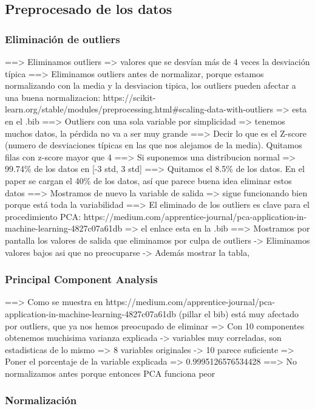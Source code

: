 \documentclass[11pt]{article}
\begin{document}
\subsection{Preprocesado de los datos}

\subsubsection{Eliminación de outliers}

==> Eliminamos outliers => valores que se desvían más de 4 veces la desviación típica
==> Eliminamos outliers antes de normalizar, porque estamos normalizando con la media y la desviacion tipica, los outliers pueden afectar a una buena normalizacion: https://scikit-learn.org/stable/modules/preprocessing.html\#scaling-data-with-outliers => esta en el .bib
==> Outliers con una sola variable por simplicidad => tenemos muchos datos, la pérdida no va a ser muy grande
==> Decir lo que es el Z-score (numero de desviaciones típicas en las que nos alejamos de la media). Quitamos filas con z-score mayor que 4
==> Si suponemos una distribucion normal => 99.74\% de los datos en [-3 std, 3 std]
==> Quitamos el 8.5\% de los datos. En el paper se cargan el 40\% de los datos, así que parece buena idea eliminar estos datos
==> Mostramos de nuevo la variable de salida => sigue funcionando bien porque está toda la variabilidad
==> El eliminado de los outliers es clave para el procedimiento PCA: https://medium.com/apprentice-journal/pca-application-in-machine-learning-4827c07a61db => el enlace esta en la .bib
==> Mostramos por pantalla los valores de salida que eliminamos por culpa de outliers -> Eliminamos valores bajos asi que no preocuparse -> Además mostrar la tabla,

\subsubsection{Principal Component Analysis}

==> Como se muestra en https://medium.com/apprentice-journal/pca-application-in-machine-learning-4827c07a61db (pillar el bib) está muy afectado por outliers, que ya nos hemos preocupado de eliminar
=> Con 10 componentes obtenemos muchisima varianza explicada -> variables muy correladas, son estadisticas de lo mismo
=> 8 variables originales -> 10 parece suficiente
=> Poner el porcentaje de la variable explicada
        => 0.9995126576534428
==> No normalizamos antes porque entonces PCA funciona peor

\subsubsection{Normalización}
\end{document}
